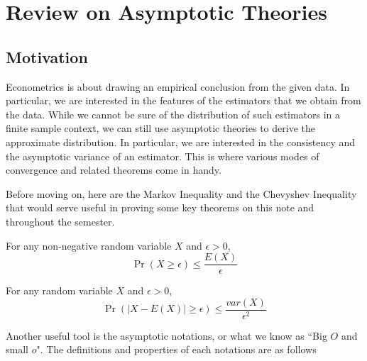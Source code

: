 


\chapter{Review on Asymptotic Theories}
\section{Motivation}
Econometrics is about drawing an empirical conclusion from the given data. In particular, we are interested in the features of the estimators that we obtain from the data. While we cannot be sure of the distribution of such estimators in a finite sample context, we can still use asymptotic theories to derive the approximate distribution. In particular, we are interested in the consistency and the asymptotic variance of an estimator. This is where various modes of convergence and related theorems come in handy. \par
Before moving on, here are the Markov Inequality and the Chevyshev Inequality that would serve useful in proving some key theorems on this note and throughout the semester. 
\begin{mdframed}[backgroundcolor=green!5] 
\begin{theorem}
For any non-negative random variable $X$ and $\epsilon>0$,
\small{\[
\Pr(X\geq\epsilon)\leq\frac{E(X)}{\epsilon}
\] }\normalsize
\end{theorem}
\begin{theorem}
For any random variable $X$ and $\epsilon>0$, 
\small{\[
\Pr(|X-E(X)|\geq\epsilon)\leq\frac{var(X)}{\epsilon^2}
\] }\normalsize
\end{theorem}
\end{mdframed}\par
Another useful tool is the asymptotic notations, or what we know as ``Big $O$ and small $o$". The definitions and properties of each notations are as follows%
